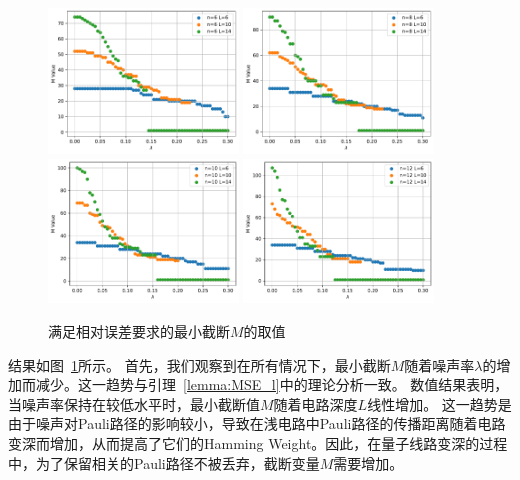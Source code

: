 \begin{figure}[htbp]
    \centering
    \includegraphics[width=0.45\textwidth]{figures/complexity2/6}
    \includegraphics[width=0.45\textwidth]{figures/complexity2/8}
    \includegraphics[width=0.45\textwidth]{figures/complexity2/10}
    \includegraphics[width=0.45\textwidth]{figures/complexity2/12}
    \caption{满足相对误差要求的最小截断$M$的取值}\label{fig:numerical_M}
\end{figure}

结果如图~\ref{fig:numerical_M}所示。
首先，我们观察到在所有情况下，最小截断$M$随着噪声率$\lambda$的增加而减少。这一趋势与引理~\ref{lemma:MSE_l}中的理论分析一致。
数值结果表明，当噪声率保持在较低水平时，最小截断值$M$随着电路深度$L$线性增加。
这一趋势是由于噪声对Pauli路径的影响较小，导致在浅电路中Pauli路径的传播距离随着电路变深而增加，从而提高了它们的Hamming Weight。因此，在量子线路变深的过程中，为了保留相关的Pauli路径不被丢弃，截断变量$M$需要增加。

